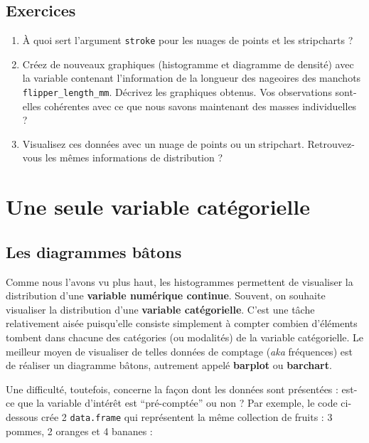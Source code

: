 \documentclass[
  a4paper,
  DIV=11,
  numbers=noendperiod,
  oneside]{scrreprt}
\begin{document}
\subsection{Exercices}\label{sec-exo-4}

\begin{enumerate}
\def\labelenumi{\arabic{enumi}.}
\item
  À quoi sert l'argument \texttt{stroke} pour les nuages de points et
  les stripcharts ?
\item
  Créez de nouveaux graphiques (histogramme et diagramme de densité)
  avec la variable contenant l'information de la longueur des nageoires
  des manchots \texttt{flipper\_length\_mm}. Décrivez les graphiques
  obtenus. Vos observations sont-elles cohérentes avec ce que nous
  savons maintenant des masses individuelles ?
\item
  Visualisez ces données avec un nuage de points ou un stripchart.
  Retrouvez-vous les mêmes informations de distribution ?
\end{enumerate}

\section{Une seule variable
catégorielle}\label{une-seule-variable-catuxe9gorielle}

\subsection{Les diagrammes bâtons}\label{les-diagrammes-buxe2tons}

Comme nous l'avons vu plus haut, les histogrammes permettent de
visualiser la distribution d'une \textbf{variable numérique continue}.
Souvent, on souhaite visualiser la distribution d'une \textbf{variable
catégorielle}. C'est une tâche relativement aisée puisqu'elle consiste
simplement à compter combien d'éléments tombent dans chacune des
catégories (ou modalités) de la variable catégorielle. Le meilleur moyen
de visualiser de telles données de comptage (\emph{aka} fréquences) est
de réaliser un diagramme bâtons, autrement appelé \textbf{barplot} ou
\textbf{barchart}.

Une difficulté, toutefois, concerne la façon dont les données sont
présentées : est-ce que la variable d'intérêt est ``pré-comptée'' ou non
? Par exemple, le code ci-dessous crée 2 \texttt{data.frame} qui
représentent la même collection de fruits : 3 pommes, 2 oranges et 4
bananes :
\end{document}
